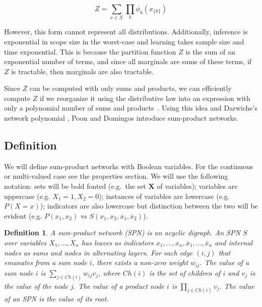 \documentclass[a4paper,10pt]{article}
\theoremstyle{plain}
\newtheorem*{spn-def}{Definition}
\begin{document}
\begin{equation*}
  Z = \sum_{x\in \mathcal{X}} \prod_k \phi_k(x_{\{k\}})
\end{equation*}

However, this form cannot represent all distributions. Additionally, inference is exponential in
scope size in the worst-case and learning takes sample size and time exponential. This is because
the partition function $Z$ is the sum of an exponential number of terms, and since all marginals
are sums of these terms, if $Z$ is tractable, then marginals are also tractable.

Since $Z$ can be computed with only sums and products, we can efficiently compute $Z$ if we
reorganize it using the distributive law into an expression with only a polynomial number of sums
and products~\cite{poon-domingos}. Using this idea and Darwiche's network polynomial
\cite{diff-approach-darwiche}, Poon and Domingos introduce sum-product networks.

\subsection{Definition}

We will define sum-product networks with Boolean variables. For the continuous or multi-valued case
see the properties section. We will use the following notation: sets will be bold fonted (e.g.\ the
set $\mathbf{X}$ of variables); variables are uppercase (e.g. $X_1=1,X_2=0$); instances of
variables are lowercase (e.g. $P(X=x)$); indicators are also lowercase but distinction between the
two will be evident (e.g. $P(x_1,x_2)$ vs $S(x_1,x_2,\overline{x}_1,\overline{x}_2)$).

\begin{spn-def}
  A sum-product network (SPN) is an acyclic digraph. An SPN $S$ over variables $X_1,\ldots,X_n$ has
  leaves as indicators $x_1,\ldots,x_n,\overline{x}_1,\ldots,\overline{x}_n$ and internal nodes as
  sums and nodes in alternating layers. For each edge $(i,j)$ that emanates from a sum node $i$,
  there exists a non-zero weight $w_{ij}$. The value of a sum node $i$ is $\sum_{j\in Ch(i)}
  w_{ij}v_j$, where $Ch(i)$ is the set of children of $i$ and $v_j$ is the value of the node $j$.
  The value of a product node $i$ is $\prod_{j\in Ch(i)} v_j$. The value of an SPN is the value of
  its root.
\end{spn-def}
\end{document}
